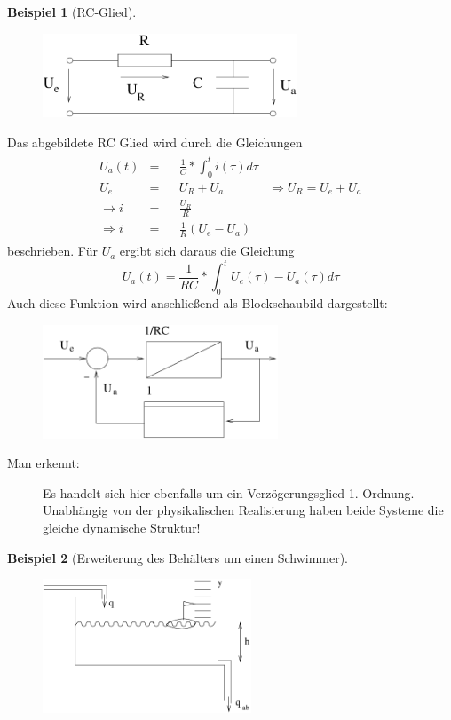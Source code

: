 \documentclass[12pt,a4paper,ngerman]{scrartcl}
\newtheorem{bsp}{Beispiel}[section] %
\begin{document}
\begin{bsp}[RC-Glied]
\end{bsp}
\begin{figure}[H]
\includegraphics[height=2.5cm]{sysregel_RC}
\end{figure}
Das abgebildete RC Glied wird durch die Gleichungen
\begin{align*}
  \begin{array}{lrlll}
  U_a(t)&=&&\frac{1}{C}*\int_0^t{i(\tau)d\tau}\\
  U_e&=&&U_R+U_a &\Rightarrow U_R=U_e+U_a\\
  \rightarrow i&=&&\frac{U_R}{R}\\
  \Rightarrow i&=&&\frac{1}{R}(U_e-U_a)
 \end{array}
\end{align*}
beschrieben. Für $U_a$ ergibt sich daraus die Gleichung
\begin{equation*}
  U_a(t)=\frac{1}{RC}*\int_0^t{U_e(\tau)-U_a(\tau)d\tau}
\end{equation*}
Auch diese Funktion wird anschließend als Blockschaubild dargestellt:
\begin{figure}[H]
\includegraphics[width=7cm]{sysregel_bsb3}
\end{figure}
\begin{description}
\item[Man erkennt:] Es handelt sich hier ebenfalls um ein Verzögerungsglied 1. Ordnung. Unabhängig von der physikalischen Realisierung haben beide Systeme die gleiche dynamische Struktur!
\end{description}
\begin{bsp}[Erweiterung des Behälters um einen Schwimmer]
\end{bsp}
\begin{minipage}{.4\linewidth}
\begin{figure}[H]
  \includegraphics[height=4cm]{sysregel_bsp_4}
\end{figure}
\end{minipage}
\end{document}
